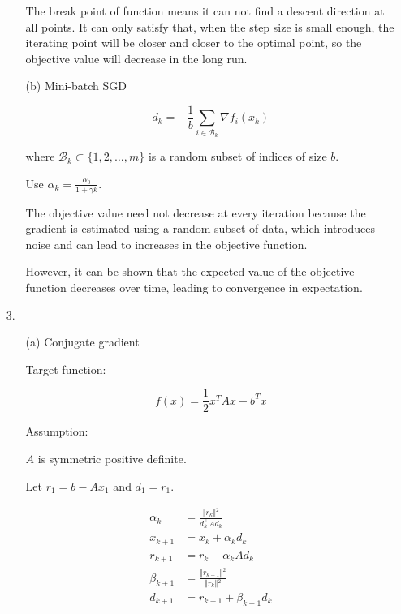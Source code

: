 \documentclass[11pt,a4paper]{article}
\begin{document}
\begin{enumerate}
\begin{enumerate}
        The break point of function means it can not find a descent direction at all points. It can only satisfy that, when the step size is small enough, the iterating point will be closer and closer to the optimal point, so the objective value will decrease in the long run.
        
        \item[(b)] Mini-batch SGD
        
        $$
        d_k = -\frac{1}{b} \sum_{i \in \mathcal{B}_k} \nabla f_i(x_k)
        $$

        where $\mathcal{B}_k \subset \{1, 2, \ldots, m\}$ is a random subset of indices of size $b$.

        Use $\alpha_k = \frac{\alpha_0}{1 + \gamma k}$.

        The objective value need not decrease at every iteration because the gradient is estimated using a random subset of data, which introduces noise and can lead to increases in the objective function.

        However, it can be shown that the expected value of the objective function decreases over time, leading to convergence in expectation.
    \end{enumerate}

    \item[3. ]
    
    \begin{enumerate}
        \item[(a)] Conjugate gradient
        
        Target function:

        $$
        f(x) = \frac{1}{2} x^T A x - b^T x
        $$

        Assumption:

        $A$ is symmetric positive definite.

        Let $r_1 = b - A x_1$ and $d_1 = r_1$.

        $$
        \begin{aligned}
        \alpha_k &= \frac{\Vert{}r_k\Vert{}^2}{d_k^\top A d_k} \\
        x_{k+1} &= x_k + \alpha_k d_k \\
        r_{k+1} &= r_k - \alpha_k A d_k \\
        \beta_{k+1} &= \frac{\Vert{}r_{k+1}\Vert{}^2}{\Vert{}r_k\Vert{}^2} \\
        d_{k+1} &= r_{k+1} + \beta_{k+1} d_k
        \end{aligned}
        $$


\end{enumerate}
\end{enumerate}
\end{document}
